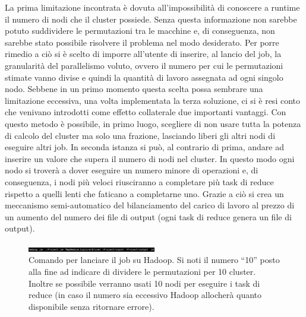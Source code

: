 \documentclass[]{IEEEtran}
\begin{document}
La prima limitazione incontrata è dovuta all'impossibilità di conoscere a runtime il numero di nodi che il cluster possiede. Senza questa informazione non sarebbe potuto suddividere le permutazioni tra le macchine e, di conseguenza, non sarebbe stato possibile risolvere il problema nel modo desiderato. Per porre rimedio a ciò si è scelto di imporre all'utente di inserire, al lancio del job, la granularità del parallelismo voluto, ovvero il numero per cui le permutazioni stimate vanno divise e quindi la quantità di lavoro assegnata ad ogni singolo nodo. Sebbene in un primo momento questa scelta possa sembrare una limitazione eccessiva, una volta implementata la terza soluzione, ci si è resi conto che venivano introdotti come effetto collaterale due importanti vantaggi. Con questo metodo è possibile, in primo luogo, scegliere di non usare tutta la potenza di calcolo del cluster ma solo una frazione, lasciando liberi gli altri nodi di eseguire altri job. In seconda istanza si può, al contrario di prima, andare ad inserire un valore che supera il numero di nodi nel cluster. In questo modo ogni nodo si troverà a dover eseguire un numero minore di operazioni e, di conseguenza, i nodi più veloci riusciranno a completare più task di reduce rispetto a quelli lenti che faticano a completarne uno. Grazie a ciò si crea un meccanismo semi-automatico del bilanciamento del carico di lavoro al prezzo di un aumento del numero dei file di output (ogni task di reduce genera un file di output).
\begin{figure}
	\includegraphics[width=0.5\textwidth]{images/exec.png}
	\caption{Comando per lanciare il job su Hadoop. Si noti il numero ``10'' posto alla fine ad indicare di dividere le permutazioni per 10 cluster. Inoltre se possibile verranno usati 10 nodi per eseguire i task di reduce (in caso il numero sia eccessivo Hadoop allocherà quanto disponibile senza ritornare errore).}
\end{figure}
\end{document}
